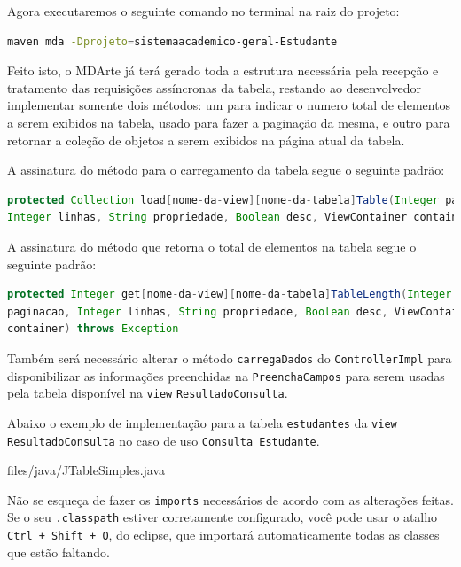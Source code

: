 Agora executaremos o seguinte comando no terminal na raiz do projeto:

\begin{lstlisting}[language=bash, frame=single, breaklines=true]
maven mda -Dprojeto=sistemaacademico-geral-Estudante
\end{lstlisting}

Feito isto, o MDArte já terá gerado toda a estrutura necessária pela recepção e
tratamento das requisições assíncronas da tabela, restando ao desenvolvedor
implementar somente dois métodos: um para indicar o numero total de elementos a
serem exibidos na tabela, usado para fazer a paginação da mesma, e outro para
retornar a coleção de objetos a serem exibidos na página atual da tabela.

A assinatura do método para o carregamento da tabela segue o seguinte padrão:

\begin{lstlisting}[language=java, frame=single, breaklines=true]
protected Collection load[nome-da-view][nome-da-tabela]Table(Integer paginacao,
Integer linhas, String propriedade, Boolean desc, ViewContainer container) 
\end{lstlisting}

A assinatura do método que retorna o total de elementos na tabela segue o
seguinte padrão:

\begin{lstlisting}[language=java, frame=single, breaklines=true]
protected Integer get[nome-da-view][nome-da-tabela]TableLength(Integer
paginacao, Integer linhas, String propriedade, Boolean desc, ViewContainer
container) throws Exception
\end{lstlisting}

Também será necessário alterar o método \texttt{carregaDados} do
\texttt{ControllerImpl} para disponibilizar as informações preenchidas na
\texttt{PreenchaCampos} para serem usadas pela tabela disponível na
\texttt{view} \texttt{ResultadoConsulta}.

Abaixo o exemplo de implementação para a tabela \texttt{estudantes} da
\texttt{view ResultadoConsulta} no caso de uso \texttt{Consulta Estudante}.

 {files/java/JTableSimples.java}

Não se esqueça de fazer os \texttt{imports} necessários de acordo com as
alterações feitas. Se o seu \texttt{.classpath} estiver corretamente
configurado, você pode usar o atalho \texttt{Ctrl + Shift + O}, do eclipse, que
importará automaticamente todas as classes que estão faltando.

